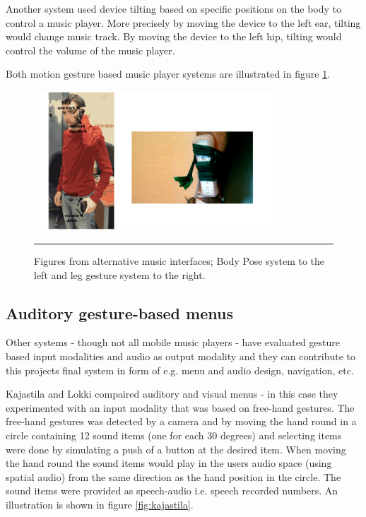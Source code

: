 Another system \cite{strachan_bodyspace_2007} used device tilting based on specific positions on the body to control a music player. More precisely by moving the device to the left ear, tilting would change music track. By moving the device to the left hip, tilting would control the volume of the music player.

Both motion gesture based music player systems are illustrated in figure \ref{fig:bodyandleg}.

\begin{figure}[b]
	\centering
		\includegraphics[width=0.8\textwidth,height=\textheight,keepaspectratio]{./Figures/bodyposeandleg.png}
		\rule{35em}{0.5pt}
	\caption[Body gesture based music players]{Figures from alternative music interfaces; Body Pose system \cite{strachan_bodyspace_2007} to the left and leg gesture system \cite{smus_running_2010} to the right.}
	\label{fig:bodyandleg}
\end{figure}

\subsection{Auditory gesture-based menus}
\label{sec:auditorygesturebasedmenus}
Other systems - though not all mobile music players - have evaluated gesture based input modalities and audio as output modality and they can contribute to this projects final system in form of e.g. menu and audio design, navigation, etc.

Kajastila and Lokki \cite{kajastila_eyes-free_2013} compaired auditory and visual menus - in this case they experimented with an input modality that was based on free-hand gestures. The free-hand gestures was detected by a camera and by moving the hand round in a circle containing 12 sound items (one for each 30 degrees) and selecting items were done by simulating a push of a button at the desired item. When moving the hand round the sound items would play in the users audio space (using spatial audio) from the same direction as the hand position in the circle. The sound items were provided as speech-audio i.e. speech recorded numbers. An illustration is shown in figure \ref{fig:kajastila}.

